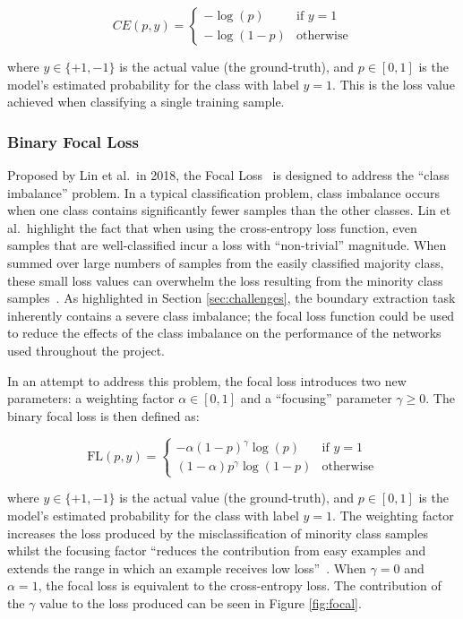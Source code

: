 \begin{equation}
    CE(p, y) = 
    \begin{cases}
        -\log(p) & \text{if } y = 1\\
        -\log(1 - p) & \text{otherwise}
    \end{cases}
\end{equation}

where $y \in \{+1, -1\}$ is the actual value (the ground-truth), and $p \in [0, 1]$ is the model's estimated probability for the class with label $y = 1$. This is the loss value achieved when classifying a single training sample.

\subsubsection{Binary Focal Loss}

Proposed by Lin et al.\ in 2018, the Focal Loss~\cite{focalloss} is designed to address the ``class imbalance'' problem. In a typical classification problem, class imbalance occurs when one class contains significantly fewer samples than the other classes. Lin et al.\ highlight the fact that when using the cross-entropy loss function, even samples that are well-classified incur a loss with ``non-trivial'' magnitude. When summed over large numbers of samples from the easily classified majority class, these small loss values can overwhelm the loss resulting from the minority class samples~\cite{focalloss}. As highlighted in Section \ref{sec:challenges}, the boundary extraction task inherently contains a severe class imbalance; the focal loss function could be used to reduce the effects of the class imbalance on the performance of the networks used throughout the project.

In an attempt to address this problem, the focal loss introduces two new parameters: a weighting factor $\alpha \in [0, 1]$ and a ``focusing'' parameter $\gamma \geq 0$.
The binary focal loss is then defined as:

\begin{equation}
    \text{FL}(p, y) = 
    \begin{cases}
        -\alpha(1 - p)^{\gamma} \log (p) & \text{if } y = 1\\
        (1 - \alpha)p^{\gamma} \log (1 - p) & \text{otherwise}
    \end{cases}
\end{equation}

where $y \in \{+1, -1\}$ is the actual value (the ground-truth), and $p \in [0, 1]$ is the model's estimated probability for the class with label $y = 1$. The weighting factor increases the loss produced by the misclassification of minority class samples whilst the focusing factor ``reduces the contribution from easy examples and extends the range in which an example receives low loss''~\cite{focalloss}. When $\gamma = 0$ and $\alpha = 1$, the focal loss is equivalent to the cross-entropy loss. The contribution of the $\gamma$ value to the loss produced can be seen in Figure \ref{fig:focal}.

